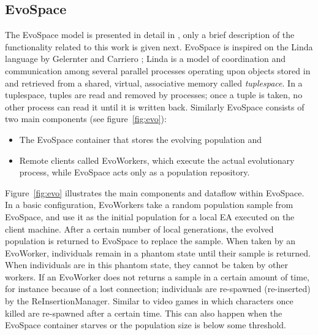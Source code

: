 \documentclass{sig-alternate}
\begin{document}
\subsection{EvoSpace} %
The EvoSpace model is presented in detail in \cite{EvoSpace}, only a
brief description of the functionality related to this work is given
next.  EvoSpace is inspired on the Linda language by Gelernter and
Carriero \cite{linda}; Linda is a model of coordination and
communication among several parallel processes operating upon objects
stored in and retrieved from a shared, virtual, associative memory
called {\em tuplespace}. In a tuplespace, tuples are read and removed by processes; once a tuple is taken, no other process can read it until it is written back. Similarly EvoSpace consists of two main components (see figure~\ref{fig:evo}):\begin{itemize}
\item The EvoSpace container
that stores the evolving population and
\item Remote clients called
EvoWorkers, %
which execute the actual evolutionary process, while EvoSpace acts
only as a population repository.

\end{itemize}

Figure~\ref{fig:evo} illustrates the main components and dataflow within EvoSpace.
In a basic configuration, EvoWorkers take a random population sample from EvoSpace,
and use it as the initial population for a local EA
executed on the client machine. After a certain number of local generations, the
evolved population is returned to EvoSpace to replace the sample.
When taken by an EvoWorker,
individuals  remain in a phantom state until their sample is
returned. When individuals are in this phantom state, they cannot be taken by other workers. If an EvoWorker does not returns a sample in a certain
amount of time, for instance because of a lost connection; individuals
are re-spawned (re-inserted) by the ReInsertionManager. Similar to
video games in which characters once killed are re-spawned after a
certain time. This can also happen when the EvoSpace container starves
or the population size is below some threshold.
\end{document}
